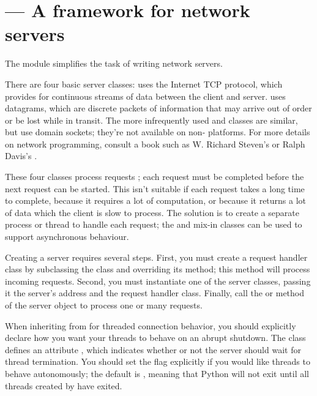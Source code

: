 \section{ ---
         A framework for network servers}



The  module simplifies the task of writing network
servers.

There are four basic server classes:  uses the
Internet TCP protocol, which provides for continuous streams of data
between the client and server.   uses datagrams, which
are discrete packets of information that may arrive out of order or be
lost while in transit.  The more infrequently used
 and  classes are
similar, but use \UNIX{} domain sockets; they're not available on
non-\UNIX{} platforms.  For more details on network programming, consult
a book such as W. Richard Steven's 
or Ralph Davis's .

These four classes process requests ; each request
must be completed before the next request can be started.  This isn't
suitable if each request takes a long time to complete, because it
requires a lot of computation, or because it returns a lot of data
which the client is slow to process.  The solution is to create a
separate process or thread to handle each request; the
 and  mix-in classes can be
used to support asynchronous behaviour.

Creating a server requires several steps.  First, you must create a
request handler class by subclassing the 
class and overriding its  method; this method will
process incoming requests.  Second, you must instantiate one of the
server classes, passing it the server's address and the request
handler class.  Finally, call the  or
 method of the server object to process one or
many requests.

When inheriting from  for threaded connection
behavior, you should explicitly declare how you want your threads
to behave on an abrupt shutdown. The  class
defines an attribute , which indicates whether
or not the server should wait for thread termination. You should
set the flag explicitly if you would like threads to behave
autonomously; the default is , meaning that Python
will not exit until all threads created by  have
exited.

